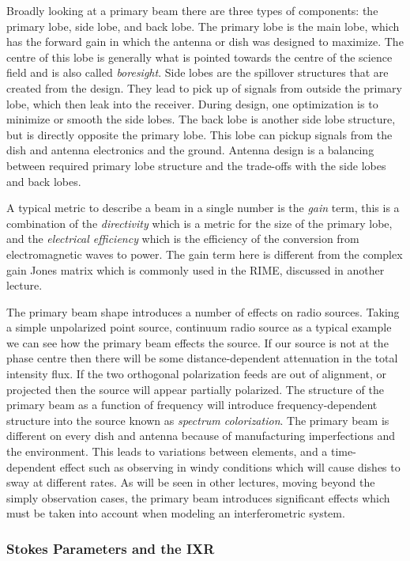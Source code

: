 \documentclass[usenatbib,usegraphicx]{article}
\begin{document}
Broadly looking at a primary beam there are three types of components: the primary lobe, side lobe, and back lobe.
The primary lobe is the main lobe, which has the forward gain in which the antenna or dish was designed to maximize.
The centre of this lobe is generally what is pointed towards the centre of the science field and is also called \emph{boresight}.
Side lobes are the spillover structures that are created from the design.
They lead to pick up of signals from outside the primary lobe, which then leak into the receiver.
During design, one optimization is to minimize or smooth the side lobes.
The back lobe is another side lobe structure, but is directly opposite the primary lobe.
This lobe can pickup signals from the dish and antenna electronics and the ground.
Antenna design is a balancing between required primary lobe structure and the trade-offs with the side lobes and back lobes.

A typical metric to describe a beam in a single number is the \emph{gain} term, this is a combination of the \emph{directivity} which is a metric for the size of the primary lobe, and the \emph{electrical efficiency} which is the efficiency of the conversion from electromagnetic waves to power.
The gain term here is different from the complex gain Jones matrix which is commonly used in the RIME, discussed in another lecture.

The primary beam shape introduces a number of effects on radio sources.
Taking a simple unpolarized point source, continuum radio source as a typical example we can see how the primary beam effects the source.
If our source is not at the phase centre then there will be some distance-dependent attenuation in the total intensity flux.
If the two orthogonal polarization feeds are out of alignment, or projected then the source will appear partially polarized.
The structure of the primary beam as a function of frequency will introduce frequency-dependent structure into the source known as \emph{spectrum colorization}.
The primary beam is different on every dish and antenna because of manufacturing imperfections and the environment.
This leads to variations between elements, and a time-dependent effect such as observing in windy conditions which will cause dishes to sway at different rates.
As will be seen in other lectures, moving beyond the simply observation cases, the primary beam introduces significant effects which must be taken into account when modeling an interferometric system.

\subsubsection{Stokes Parameters and the IXR}
\end{document}
